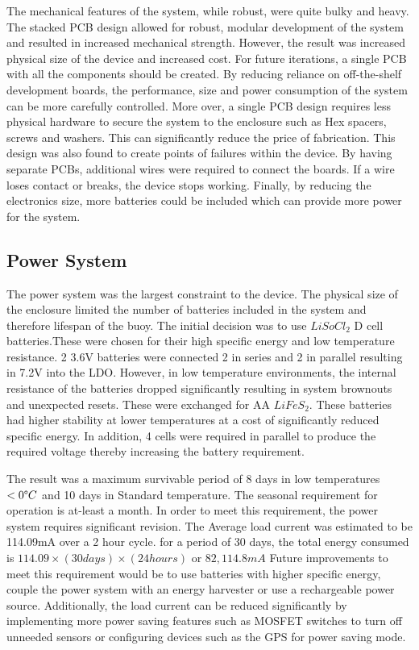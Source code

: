 The mechanical features of the system, while robust, were quite bulky and heavy. The stacked PCB design allowed for robust, modular development of the system and resulted in increased mechanical strength. However, the result was increased physical size of the device and increased cost. For future iterations, a single PCB with all the components should be created. By reducing reliance on off-the-shelf development boards, the performance, size and power consumption of the system can be more carefully controlled. More over, a single PCB design requires less physical hardware to secure the system to the enclosure such as Hex spacers, screws and washers. This can significantly reduce the price of fabrication. This design was also found to create points of failures within the device. By having separate PCBs, additional wires were required to connect the boards. If a wire loses contact or breaks, the device stops working. Finally, by reducing the electronics size, more batteries could be included which can provide more power for the system.

\subsection{Power System}

The power system was the largest constraint to the device. The physical size of the enclosure limited the number of batteries included in the system and therefore lifespan of the buoy. The initial decision was to use $LiSoCl_2$ D cell batteries.These were chosen for their high specific energy and low temperature resistance. 2 3.6V batteries were connected 2 in series and 2 in parallel resulting in 7.2V into the LDO. However, in low temperature environments, the internal resistance of the batteries dropped significantly resulting in system brownouts and unexpected resets. These were exchanged for AA $LiFeS_2$. These batteries had higher stability at lower temperatures at a cost of significantly reduced specific energy. In addition, 4 cells were required in parallel to produce the required voltage thereby increasing the battery requirement.\par 

The result was a maximum survivable period of 8 days in low temperatures $< 0 \degree C$ and 10 days in Standard temperature. The seasonal requirement for operation is at-least a month. In order to meet this requirement, the power system requires significant revision. The Average load current was estimated to be 114.09mA over a 2 hour cycle. for a period of 30 days, the total energy consumed is $114.09 \times (30 days) \times (24 hours)$ or $82,114.8mA$ Future improvements to meet this requirement would be to use batteries with higher specific energy, couple the power system with an energy harvester or use a rechargeable power source. Additionally, the load current can be reduced significantly by implementing more power saving features such as MOSFET switches to turn off unneeded sensors or configuring devices such as the GPS for power saving mode.

